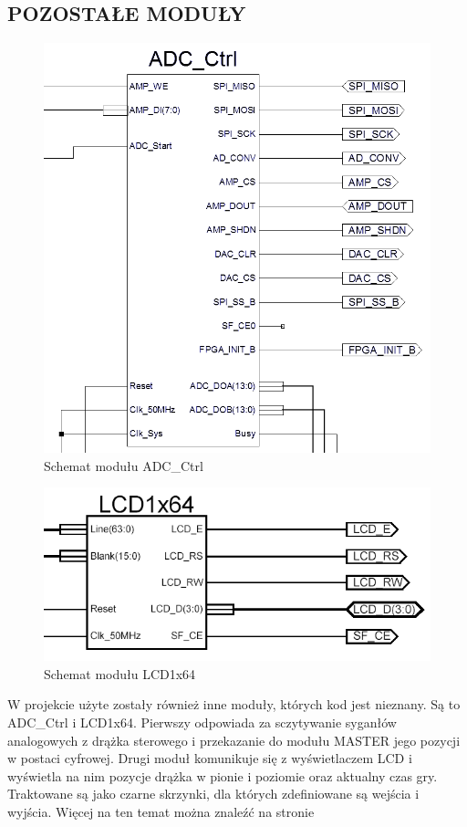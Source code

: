 \documentclass[11pt]{article}
\begin{document}
\subsection{POZOSTAŁE MODUŁY}

\begin{figure}[h!]
\centering
\includegraphics[scale=.5]{ADC_Ctrl.PNG}
\caption{Schemat modułu ADC\_Ctrl}
\end{figure}

\begin{figure}[h!]
\centering
\includegraphics[scale=.5]{LCD1x64.PNG}
\caption{Schemat modułu LCD1x64}
\end{figure}

W projekcie użyte zostały również inne moduły, których kod jest nieznany.
Są to ADC\_Ctrl i LCD1x64.
Pierwszy odpowiada za sczytywanie syganłów analogowych z drążka sterowego i przekazanie do modułu MASTER jego pozycji w postaci cyfrowej.
Drugi moduł komunikuje się z wyświetlaczem LCD i wyświetla na nim pozycje drążka w pionie i poziomie oraz aktualny czas gry.
Traktowane są jako czarne skrzynki, dla których zdefiniowane są wejścia i wyjścia.
Więcej na ten temat można znaleźć na stronie 
\end{document}
